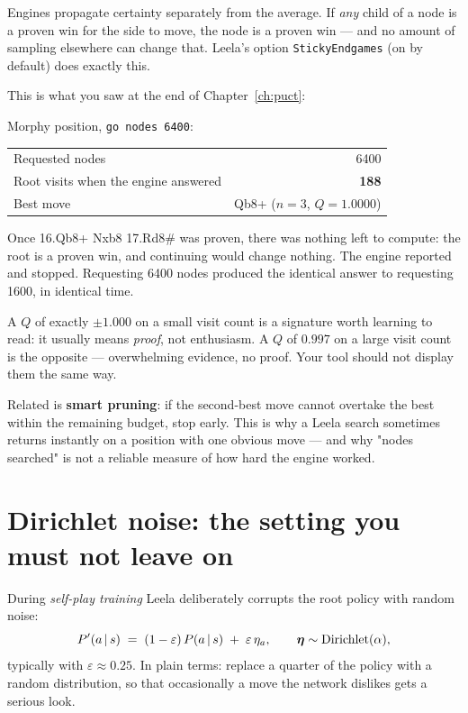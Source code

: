 Engines propagate certainty separately from the average. If \emph{any} child of a node is a
proven win for the side to move, the node is a proven win --- and no amount of sampling
elsewhere can change that. Leela's option \texttt{StickyEndgames} (on by default) does exactly
this.

This is what you saw at the end of Chapter~\ref{ch:puct}:

\begin{realdata}[title={Real engine output: a search that stops early}]
Morphy position, \texttt{go nodes 6400}:
\begin{center}
\begin{tabular}{@{}lr@{}}
\toprule
Requested nodes & 6400 \\
Root visits when the engine answered & \textbf{188} \\
Best move & Qb8+ ($n = 3$, $Q = 1.0000$) \\
\bottomrule
\end{tabular}
\end{center}
Once 16.Qb8+ Nxb8 17.Rd8\# was proven, there was nothing left to compute: the root is a
proven win, and continuing would change nothing. The engine reported and stopped. Requesting
6400 nodes produced the identical answer to requesting 1600, in identical time.
\end{realdata}

\begin{keyidea}
A $Q$ of exactly $\pm1.000$ on a small visit count is a signature worth learning to read: it
usually means \emph{proof}, not enthusiasm. A $Q$ of $0.997$ on a large visit count is the
opposite --- overwhelming evidence, no proof. Your tool should not display them the same way.
\end{keyidea}

Related is \textbf{smart pruning}: if the second-best move cannot overtake the best within
the remaining budget, stop early. This is why a Leela search sometimes returns instantly on a
position with one obvious move --- and why "nodes searched" is not a reliable measure of how
hard the engine worked.

\section{Dirichlet noise: the setting you must not leave on}

During \emph{self-play training} Leela deliberately corrupts the root policy with random
noise:
\begin{equation}
  \label{eq:dirichlet}
  P'(a\,|\, s) \;=\; (1-\varepsilon)\,P(a \,|\, s) \;+\; \varepsilon\,\eta_a,
  \qquad \boldsymbol{\eta} \sim \text{Dirichlet}(\alpha),
\end{equation}
typically with $\varepsilon \approx 0.25$. In plain terms: replace a quarter of the policy
with a random distribution, so that occasionally a move the network dislikes gets a serious
look.

